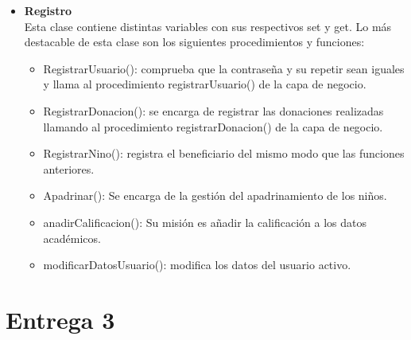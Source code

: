 \documentclass{article}
\begin{document}
\begin{itemize}
\item \textbf{Registro}\\
Esta clase contiene distintas variables con sus respectivos set y get.
Lo más destacable de esta clase son los siguientes procedimientos y funciones:
\begin{itemize}
\item RegistrarUsuario(): comprueba que la contraseña y su repetir sean iguales y llama al procedimiento registrarUsuario() de la capa de negocio.
\item RegistrarDonacion(): se encarga de registrar las donaciones realizadas llamando al procedimiento registrarDonacion() de la capa de negocio.
\item RegistrarNino(): registra el beneficiario del mismo modo que las funciones anteriores.
\item Apadrinar(): Se encarga de la gestión del apadrinamiento de los niños.
\item anadirCalificacion(): Su misión es añadir la calificación a los datos académicos.
\item modificarDatosUsuario(): modifica los datos del usuario activo. 
\end{itemize} 
\end{itemize}


\section{Entrega 3}
\end{document}
